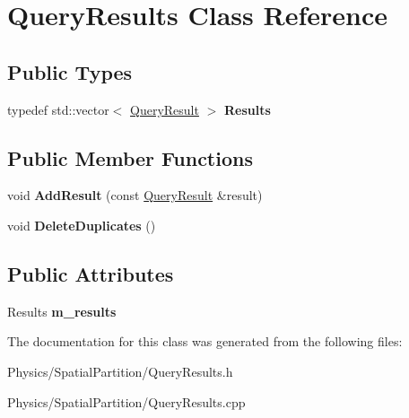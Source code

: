 \hypertarget{classQueryResults}{}\section{Query\+Results Class Reference}
\label{classQueryResults}
\subsection*{Public Types}
\begin{DoxyCompactItemize}
\item 
\mbox{\label{classQueryResults_a8791b637b315b8a5c06142eba332ad8b}} 
typedef std\+::vector$<$ \hyperlink{classQueryResult}{Query\+Result} $>$ {\bfseries Results}
\end{DoxyCompactItemize}
\subsection*{Public Member Functions}
\begin{DoxyCompactItemize}
\item 
\mbox{\label{classQueryResults_ab267e6a702a708529aa39eb140f52bd3}} 
void {\bfseries Add\+Result} (const \hyperlink{classQueryResult}{Query\+Result} \&result)
\item 
\mbox{\label{classQueryResults_a57a126b24c884f91b25a6a439b7ddf5e}} 
void {\bfseries Delete\+Duplicates} ()
\end{DoxyCompactItemize}
\subsection*{Public Attributes}
\begin{DoxyCompactItemize}
\item 
\mbox{\label{classQueryResults_a3145d22c7a0bbcb72abebf0a95f21f86}} 
Results {\bfseries m\+\_\+results}
\end{DoxyCompactItemize}


The documentation for this class was generated from the following files\+:\begin{DoxyCompactItemize}
\item 
Physics/\+Spatial\+Partition/Query\+Results.\+h\item 
Physics/\+Spatial\+Partition/Query\+Results.\+cpp\end{DoxyCompactItemize}
